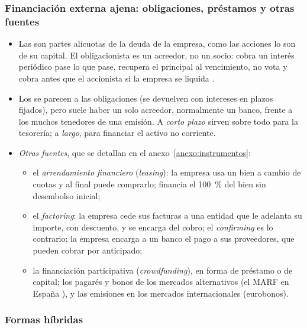 \documentclass[11pt]{article}
\begin{document}
\subsubsection{Financiación externa ajena: obligaciones, préstamos y otras fuentes}\label{sec:deuda}

\begin{itemize}
\item Las  son partes alícuotas de la deuda de la empresa, como las acciones lo son de su capital. El obligacionista es un acreedor, no un socio: cobra un interés periódico pase lo que pase, recupera el principal al vencimiento, no vota y cobra antes que el accionista si la empresa se liquida .
\item Los  se parecen a las obligaciones (se devuelven con intereses en plazos fijados), pero suele haber un solo acreedor, normalmente un banco, frente a los muchos tenedores de una emisión. A \emph{corto plazo} sirven sobre todo para la tesorería; a \emph{largo}, para financiar el activo no corriente.
\item \emph{Otras fuentes}, que se detallan en el anexo~\ref{anexo:instrumentos}:
  \begin{itemize}
  \item el \emph{arrendamiento financiero} (\emph{leasing}): la empresa usa un bien a cambio de cuotas y al final puede comprarlo; financia el 100~\% del bien sin desembolso inicial;
  \item el \emph{factoring}: la empresa cede sus facturas a una entidad que le adelanta su importe, con descuento, y se encarga del cobro; el \emph{confirming} es lo contrario: la empresa encarga a un banco el pago a sus proveedores, que pueden cobrar por anticipado;
  \item la financiación participativa (\emph{crowdfunding}), en forma de préstamo o de capital\nocite{CE2026Crowdfunding}; los pagarés y bonos de los mercados alternativos (el MARF en España ), y las emisiones en los mercados internacionales (eurobonos).
  \end{itemize}
\end{itemize}

\subsubsection{Formas híbridas}\label{sec:hibridos}
\end{document}
